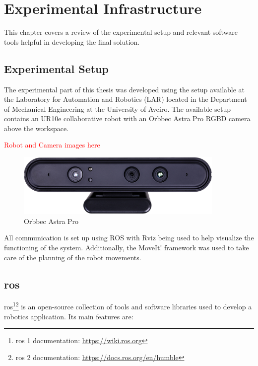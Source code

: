 \chapter{Experimental Infrastructure}
\label{chapter:experimental_infrastructure}

This chapter covers a review of the experimental setup and relevant software tools helpful in developing the final solution.

\section{Experimental Setup}

The experimental part of this thesis was developed using the setup available at the Laboratory for Automation and Robotics (LAR) located in the Department of Mechanical Engineering at the University of Aveiro. The available setup contains an UR10e collaborative robot with an Orbbec Astra Pro RGBD camera above the workspace.

\textcolor{red}{Robot and Camera images here}

\begin{figure}[h]
\centerline{\includegraphics[height=1.2in]{figs/Astra.jpg}}
\caption[Orbbec Astra Pro]{Orbbec Astra Pro \cite{AstraPro}}
\label{openpose}
\end{figure}

All communication is set up using ROS with Rviz being used to help visualize the functioning of the system. Additionally, the MoveIt! framework was used to take care of the planning of the robot movements.

\section{\acf{ros}}

\acs{ros}\cite{ROS2}\footnote{\acs{ros} 1 documentation: \url{https://wiki.ros.org}}\footnote{\acs{ros} 2 documentation: \url{https://docs.ros.org/en/humble}} is an open-source collection of tools and software libraries used to develop a robotics application. Its main features are:


